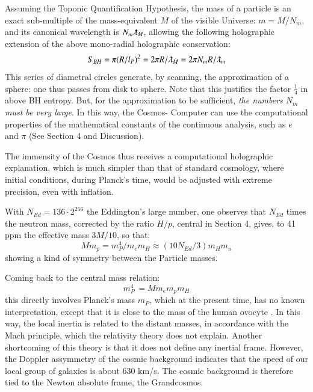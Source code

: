 \documentclass[twoside,draft]{article}
\begin{document}
\begin{sloppypar}
Assuming the Toponic Quantification Hypothesis, the mass of a particle is an exact sub-multiple
of the mass-equivalent $M$ of the visible Universe: $m = M/N_{m}$, and its canonical wavelength is $N_m \lambdabar_{M}$,
allowing the following holographic extension of the above mono-radial holographic conservation:
\begin{equation}
S_{BH} = \pi(R/l_{P})^{2} = 2\pi R/\lambdabar_{M} = 2\pi N_{m} R/\lambdabar_{m}
\end{equation}
This series of diametral circles generate, by scanning, the approximation of a sphere: one thus passes
from disk to sphere. Note that this justifies the factor $\frac{1}{4}$ in above BH entropy. But, for
the approximation to be sufficient, \textit{the numbers $N_{m}$ must be very large}. In this way, the Cosmos-
Computer can use the computational properties of the mathematical constants of the continuous
analysis, such as $e$ and $\pi$ (See Section 4 and Discussion).

The immensity of the Cosmos thus receives a computational holographic explanation, which is much simpler
than that of standard cosmology, where initial conditions, during Planck's time, would be adjusted with
extreme precision, even with inflation. 

With $N_{Ed} = 136 \cdot2^{256}$ the Eddington's large number, one observes that $N_{Ed}$ times the neutron mass, corrected by the ratio $H/p$, central in Section 4, gives, to 41 ppm the effective mass $3M/10$, so that:
\begin{equation}
Mm_p = m_P^4/m_em_H\approx(10N_{Ed}/3)m_Hm_n 
\end{equation}
showing a kind of symmetry between the Particle masses.

Coming back to the central mass relation:
\begin{equation}
m_{P}^{4}\, = M m_{e} m_{p} m_{H}
\end{equation}
this directly involves Planck's mass $m_{P}$, which at the present time, has no known interpretation, except
that it is close to the mass of the human ovocyte \cite{Sanchez1}. In this way, the local inertia is related to the distant
masses, in accordance with the Mach principle, which the relativity theory does not explain.
Another shortcoming of this theory is that it does not define any inertial frame. However, the
Doppler assymmetry of the cosmic background indicates that the speed of our local group of galaxies is about
630 km/s. The cosmic background is therefore tied to the Newton absolute frame, the Grandcosmos.


\end{sloppypar}
\end{document}
